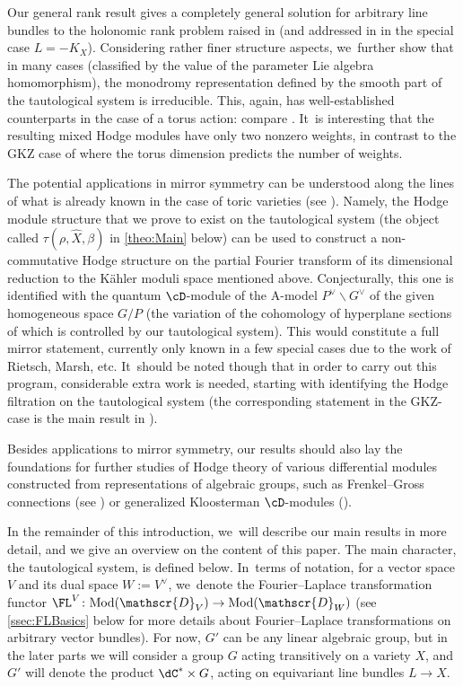 Our general rank result gives a completely general solution for
arbitrary line bundles to the holonomic rank problem raised in
\cite{Bloch_HolRankProb} (and addressed in \cite{HuangLianZhu} in the
special case $L=-K_X$). Considering rather finer structure aspects, we~further show that in many cases (classified by the value of the
parameter Lie algebra homomorphism), the monodromy representation
defined by the smooth part of the tautological system is irreducible.
This, again, has well-established counterparts in the
case of a torus action: compare
\cite{GKZ90,W-taka,Saito11,SW12,Beukers}. It~is interesting that the resulting mixed Hodge modules have only two nonzero weights, in contrast to the GKZ case of \cite{ReichWalth-Weight} where the torus dimension predicts the number of weights.\enlargethispage{\baselineskip}

The potential applications in mirror symmetry can be understood along the lines of what is already known in the case of toric varieties (see \cite{RS10, RS12, RS20}). Namely, the Hodge module structure that we prove to exist on the tautological system (the object called $\tau(\rho, \hat{X}, \beta)$ in \cref{theo:Main} below) can be used to construct a non-commutative Hodge structure on the partial Fourier transform of its dimensional reduction to the Kähler moduli space mentioned above. Conjecturally, this one is identified with the quantum $\cD$\nobreakdash-mod\-ule of the A-model $P^\vee\backslash G^\vee$ of the given homogeneous space $G/P$ (the variation of the cohomology of hyperplane sections of which is controlled by our tautological system). This would constitute a full mirror statement, currently only known in a few special cases due to the work of Rietsch, Marsh, etc. It~should be noted though that in order to carry out this program, considerable extra work is needed, starting with identifying the Hodge filtration on the tautological system (the corresponding statement in the GKZ-case is the main result in \cite{RS20}).

Besides applications to
mirror symmetry, our results should also lay the foundations for
further studies of Hodge theory of various differential modules
constructed from representations of algebraic groups, such as
Frenkel--Gross connections (see \cite{FrenkelGross}) or generalized
Kloosterman $\cD$\nobreakdash-mod\-ules (\cite{HeinlothNgoYun}).

In the remainder of this introduction, we~will describe our main results in more detail, and we give an overview on the content of this paper. The main character, the tautological system, is defined below. In~terms of notation, for a vector space $V$ and its dual space $W:=V^\vee$, we~denote the Fourier--Laplace transformation functor
$\FL^V\colon \textup{Mod}(\mathscr{D}_V)\to\textup{Mod}(\mathscr{D}_W)$ (see \cref{ssec:FLBasics} below for more details about Fourier--Laplace transformations on arbitrary vector bundles). For now, $G'$ can be any linear algebraic group, but in the
later parts we will consider a group $G$ acting transitively on a variety $X$, and $G'$ will denote the
product $\dC^*\times G$, acting on equivariant line bundles $L\to X$.

